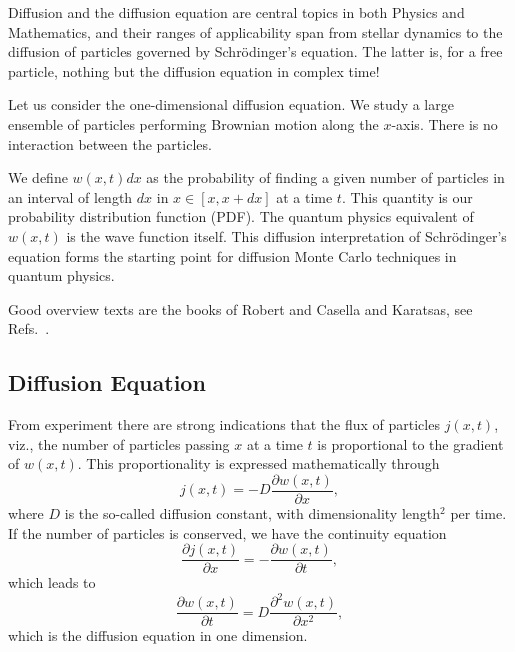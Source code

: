 Diffusion and the diffusion equation are central topics in both Physics and Mathematics,
and their ranges of applicability span from stellar dynamics to the diffusion 
of particles governed by Schr\"odinger's equation. The latter is, for a free particle, 
nothing but the diffusion equation in complex time!

Let us consider the one-dimensional diffusion equation. We study a large ensemble of particles
performing Brownian motion along the $x$-axis. There is no interaction between the particles.

We define $w(x,t)dx$ as the probability of finding a given number of particles in an
interval of length $dx$ in $x\in [x, x+dx]$ at a time $t$. This quantity is our probability
distribution function (PDF). The quantum physics equivalent of 
$w(x,t)$ is the wave 
function  itself. This diffusion interpretation of Schr\"odinger's equation forms the starting
point for diffusion Monte Carlo techniques in quantum physics.

Good overview texts are the books of Robert and Casella and Karatsas, see Refs.~\cite{robertcasella,karatsas}.

\subsection{Diffusion Equation}
From experiment there are strong indications that the flux of particles $j(x,t)$, viz., the number of particles passing $x$ at a time $t$ is proportional to the 
gradient of $w(x,t)$. This proportionality is expressed mathematically through 
\[
    j(x,t) = -D\frac{\partial w(x,t)}{\partial x},
\]
where $D$ is the so-called diffusion constant, with dimensionality length$^2$ per time.
If the number of particles is conserved, we have the continuity equation
\[
    \frac{\partial j(x,t)}{\partial x} = -\frac{\partial w(x,t)}{\partial t},
\]
which leads to
\begin{equation}\label{eq:diffequation1}
    \frac{\partial w(x,t)}{\partial t} = 
    D\frac{\partial^2w(x,t)}{\partial x^2},
\end{equation}
which is the diffusion equation in one dimension. 

